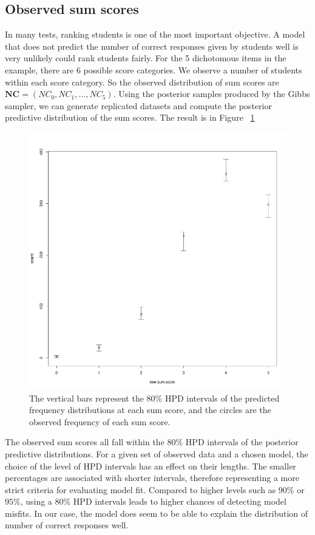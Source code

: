 \documentclass[floatsintext, man]{apa7}
\begin{document}
\subsection{Observed sum scores}
In many tests, ranking students is one of the most important objective. A model
that does not predict the number of correct responses given by students well is
very unlikely could rank students fairly. For the 5 dichotomous items in the
example, there are 6 possible score categories. We observe a number of students
within each score category. So the observed distribution of sum scores are $
\bm{NC}=(NC_0, NC_1, \dots, NC_5)$. Using the posterior samples produced by the
Gibbs sampler, we can generate replicated datasets and compute the posterior
predictive distribution of the sum scores. The result is in Figure~
\ref{fig:ppmc_raw_scores}
\begin{figure}[t]
\centering
  \includegraphics[scale=0.4]{Fig/raw_score_coverage.png}
  \caption{The vertical bars represent the $80\%$ HPD intervals of the predicted
  frequency distributions at each sum score, and the circles are the observed
  frequency of each sum score.}
  \label{fig:ppmc_raw_scores}
\end{figure}
The observed sum scores all fall within the $80\%$ HPD intervals of the posterior
predictive distributions. For a given set of observed data and a chosen
model, the choice of the level of HPD intervals has an effect on their
lengths. The smaller percentages are associated with shorter intervals,
therefore representing a more strict criteria for evaluating model fit. Compared
to higher levels such as $90\%$ or $95\%$, using a $80\%$ HPD intervals leads to
higher chances of detecting model misfits. In our case, the model does seem to
be able to explain the distribution of number of correct responses well.
\end{document}
